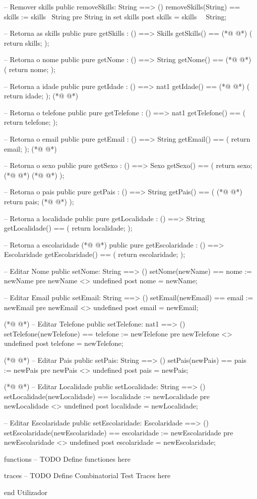 \begin{vdmpp}[breaklines=true]
 -- Remover skills
 public removeSkills: String ==> ()
 removeSkills(String) == skills := skills \ {String}
 pre String in set skills
 post skills = skills~ \ {String};
 
 -- Retorna as skills
 public pure getSkills : () ==> Skills
 getSkills() ==
(*@
\label{getIdade:86}
@*)
 (
  return skills;
 );
 
 -- Retorna o nome
 public pure getNome : () ==> String
 getNome() ==
(*@
\label{getTelefone:93}
@*)
 (
  return nome;
 );
 
 -- Retorna a idade
 public pure getIdade : () ==> nat1
 getIdade() ==
(*@
\label{getSexo:100}
@*)
 (
  return idade;
 );
(*@
\label{getEmail:103}
@*)
 
 -- Retorna o telefone
 public pure getTelefone : () ==> nat1
 getTelefone() ==
 (
  return telefone;
 );
 
 -- Retorna o email
 public pure getEmail : () ==> String
 getEmail() ==
 (
  return email;
 );
(*@
\label{setNome:117}
@*)
 
 -- Retorna o sexo
 public pure getSexo : () ==> Sexo
 getSexo() ==
 (
  return sexo;
(*@
\label{setEmail:123}
@*)
(*@
\label{getPais:123}
@*)
 );
 
 -- Retorna o pais
 public pure getPais : () ==> String
 getPais() ==
 (
(*@
\label{setTelefone:129}
@*)
  return pais;
(*@
\label{getLocalidade:130}
@*)
 );
 
 -- Retorna a localidade
 public pure getLocalidade : () ==> String
 getLocalidade() ==
 (
  return localidade;
 );
 
 -- Retorna a escolaridade
(*@
\label{getEscolaridade:140}
@*)
 public pure getEscolaridade : () ==> Escolaridade
 getEscolaridade() ==
 (
  return escolaridade;
 );
 
 -- Editar Nome
 public setNome: String ==> ()
 setNome(newName) == nome := newName
 pre newName <> undefined
 post nome = newName;
 
 -- Editar Email
 public setEmail: String ==> ()
 setEmail(newEmail) == email := newEmail
 pre newEmail <> undefined
 post email = newEmail;
 
(*@
\label{setPais:158}
@*)
 -- Editar Telefone
 public setTelefone: nat1 ==> ()
 setTelefone(newTelefone) == telefone := newTelefone
 pre newTelefone <> undefined
 post telefone = newTelefone;

(*@
\label{setLocalidade:164}
@*)
 -- Editar Pais
 public setPais: String ==> ()
 setPais(newPais) == pais := newPais
 pre newPais <> undefined
 post pais = newPais;
 
(*@
\label{setEscolaridade:170}
@*)
 -- Editar Localidade
 public setLocalidade: String ==> ()
 setLocalidade(newLocalidade) == localidade := newLocalidade
 pre newLocalidade <> undefined
 post localidade = newLocalidade;
 
 -- Editar Escolaridade
 public setEscolaridade: Escolaridade ==> ()
 setEscolaridade(newEscolaridade) == escolaridade := newEscolaridade
 pre newEscolaridade <> undefined
 post escolaridade = newEscolaridade;
 
functions
-- TODO Define functiones here

traces
-- TODO Define Combinatorial Test Traces here

end Utilizador
\end{vdmpp}
